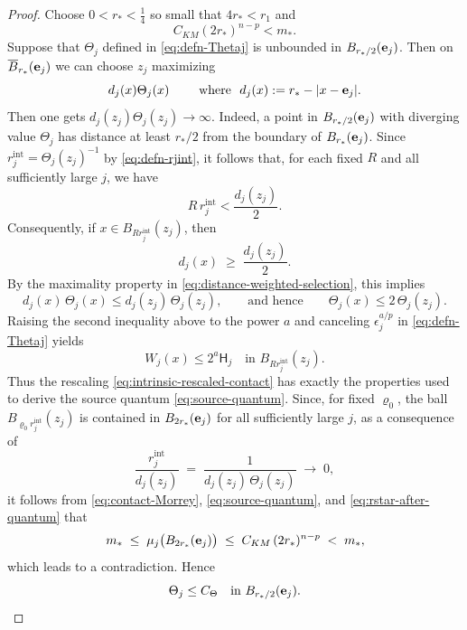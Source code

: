 \documentclass[reqno,12pt]{amsart}
\numberwithin{equation}{section}
\theoremstyle{remark}
\begin{document}
\begin{proof}
Choose $0<r_*<\frac 1 4$ so small that $4r_*<r_1$ and
\begin{equation}\label{eq:rstar-after-quantum}
C_{KM}(2r_*)^{n-p}<m_*.
\end{equation}
Suppose that $\Theta_j$ defined in \eqref{eq:defn-Thetaj} is unbounded in $B_{r_*/2}({\bf e}_j)$.  Then on $\overline B_{r_*}({\bf e}_j)$ we can choose $z_j$ maximizing
\begin{equation}\label{eq:distance-weighted-selection}
d_j(x)\Theta_j(x) 
\qquad\text{ where } \ d_j(x):=r_*-|x-{\bf e}_j|.
\end{equation}
Then one gets $d_j(z_j)\Theta_j(z_j)\to\infty$. Indeed, a point in
$B_{r_*/2}({\bf e}_j)$ with diverging value $\Theta_j$ has distance at least $r_*/2$ from the boundary of $B_{r_*}({\bf e}_j)$.  Since $r_j^{\mathrm{int}}=\Theta_j(z_j)^{-1}$ by \eqref{eq:defn-rjint}, it follows that, for each fixed $R$ and all sufficiently large $j$, we have
$$
R\,r_j^{\mathrm{int}}<\frac{d_j(z_j)}{2}.
$$
Consequently, if $x\in B_{Rr_j^{\mathrm{int}}}(z_j)$, then
$$
d_j(x)\;\ge\;\frac{d_j(z_j)}{2}.
$$
By the maximality property in \eqref{eq:distance-weighted-selection}, this implies
$$
 d_j(x)\,\Theta_j(x)\le d_j(z_j)\,\Theta_j(z_j),
 \qquad\text{and hence}\qquad \Theta_j(x) \le 2\,\Theta_j(z_j).
$$
Raising the second inequality above to the power $a$ and canceling $\epsilon_j^{a/p}$ in \eqref{eq:defn-Thetaj} yields
$$
W_j(x)\le2^a\mathsf H_j
\quad\text{in }B_{Rr_j^{\mathrm{int}}}(z_j).
$$
Thus the rescaling \eqref{eq:intrinsic-rescaled-contact} has exactly the properties used to derive the source quantum
\eqref{eq:source-quantum}.  Since, for fixed $\varrho_0$, the ball $B_{\varrho_0 r_j^{\mathrm{int}}}(z_j)$ is contained in $B_{2r_*}({\bf e}_j)$ for all sufficiently large $j$, as a consequence of
$$
\frac{r_j^{\mathrm{int}}}{d_j(z_j)} \;=\; \frac{1}{d_j(z_j)\,\Theta_j(z_j)} \;\to \; 0,
$$
it follows from \eqref{eq:contact-Morrey}, \eqref{eq:source-quantum}, and \eqref{eq:rstar-after-quantum} that
$$
m_* \;\le\; \mu_j\bigl(B_{2r_*}({\bf e}_j)\bigr)
\;\le\; C_{KM}\,(2r_*)^{n-p}
\;<\; m_*,
$$
which leads to a contradiction.  Hence
\begin{equation}\label{eq:Theta-bounded-contact}
\Theta_j\le C_{\Theta} 
\quad\text{in }B_{r_*/2}({\bf e}_j).
\end{equation}


\end{proof}
\end{document}
